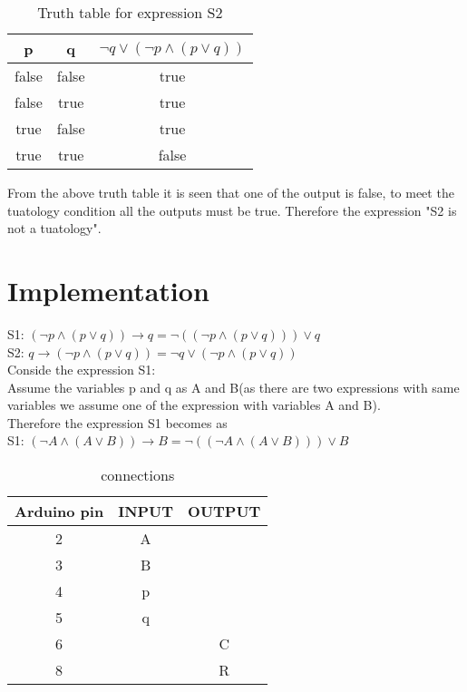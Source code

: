 \documentclass[journal,12pt,twocolumn]{IEEEtran}
\begin{document}
\begin{table}[h]
  \centering
  \caption{Truth table for expression S2}
   \begin{tabular}{|c|c|c|}
\hline
p & q & $\neg{q} \lor (\neg{p} \land ({p}\lor {q}))$\\
\hline
false & false & true\\
\hline
false & true & true\\
\hline                   
true & false & true\\
\hline
true & true & false\\   
\hline
\end{tabular}
\end{table}
    From the above truth table it is seen that one of the output is false, to meet the tuatology condition all the outputs must be true. Therefore the expression "S2 is not a tuatology".\\
\section{Implementation}
	S1: $(\neg{p} \land({p}\lor{q})) \longrightarrow q = \neg((\neg{p} \land({p}\lor{q})))\lor{q}$\\
	S2: $q \longrightarrow (\neg{p}\land({p}\lor{q})) = \neg{q} \lor (\neg{p} \land ({p}\lor {q}))$\\
Conside the expression S1:\\
	Assume the variables p and q as A and B(as there are two expressions with same variables we assume one of the expression with variables A and B).\\
Therefore the expression S1 becomes as\\
S1: $(\neg{A} \land({A}\lor{B})) \longrightarrow B = \neg((\neg{A} \land({A}\lor{B})))\lor{B}$\\
  
\begin{table}[h]
  \centering
  \caption{connections}
  \begin{tabular}{|c|c|c|}
\hline
Arduino pin & INPUT & OUTPUT\\
\hline
2 & A &\\
\hline
3 & B &\\
\hline
4 & p &\\
\hline
5 & q &\\
\hline
6 & & C\\
\hline
8 & & R\\
\hline
  \end{tabular}
\end{table}
\end{document}
